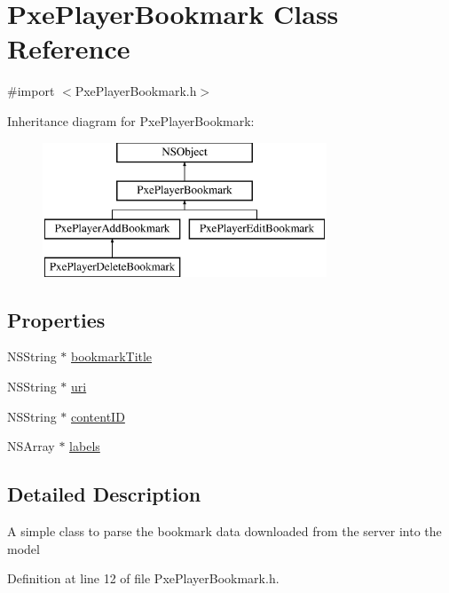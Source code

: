\hypertarget{interface_pxe_player_bookmark}{\section{Pxe\-Player\-Bookmark Class Reference}
\label{interface_pxe_player_bookmark}
}


{\ttfamily \#import $<$Pxe\-Player\-Bookmark.\-h$>$}

Inheritance diagram for Pxe\-Player\-Bookmark\-:\begin{figure}[H]
\begin{center}
\leavevmode
\includegraphics[height=4.000000cm]{interface_pxe_player_bookmark}
\end{center}
\end{figure}
\subsection*{Properties}
\begin{DoxyCompactItemize}
\item 
N\-S\-String $\ast$ \hyperlink{interface_pxe_player_bookmark_ac56c6dc4c71c9ef3010afe5b81a81cb3}{bookmark\-Title}
\item 
N\-S\-String $\ast$ \hyperlink{interface_pxe_player_bookmark_ab8b1e16b624fa00bbd92e6611222405c}{uri}
\item 
N\-S\-String $\ast$ \hyperlink{interface_pxe_player_bookmark_ae4b45f207dd31a597e765f7d53fd13e7}{content\-I\-D}
\item 
N\-S\-Array $\ast$ \hyperlink{interface_pxe_player_bookmark_a4c5726238745b908389f27e7c04e1330}{labels}
\end{DoxyCompactItemize}


\subsection{Detailed Description}
A simple class to parse the bookmark data downloaded from the server into the model 

Definition at line 12 of file Pxe\-Player\-Bookmark.\-h.



